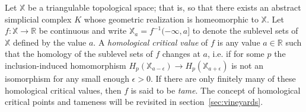\documentclass[sn-mathphys]{sn-jnl}
\newtheorem{definition}{Definition}
\begin{document}

Let $\mathbb{X}$ be a triangulable topological space; that is, so that there exists   an abstract simplicial complex $K$ whose geometric realization is homeomorphic to $\mathbb{X}$. 
Let  $f: \mathbb{X} \to \mathbb{R}$ be continuous and  write $\mathbb{X}_a = f^{-1}(-\infty, a]$ to denote the sublevel sets of $\mathbb{X}$ defined by the value $a$. 
A \emph{homological critical value} of $f$ is any value $a \in \mathbb{R}$ such that the homology of the sublevel sets of $f$ changes at $a$, i.e.  if for some $p$ the inclusion-induced homomorphism  $H_p(\mathbb{X}_{a - \epsilon}) \to H_p(\mathbb{X}_{a+\epsilon})$ is not an isomorphism for any small enough $\epsilon >0$. If there are only finitely many of these homological critical values, then $f$ is said to be \emph{tame}. The concept of homological critical points and tameness will be revisited in section~\ref{sec:vineyards}.


\end{document}
